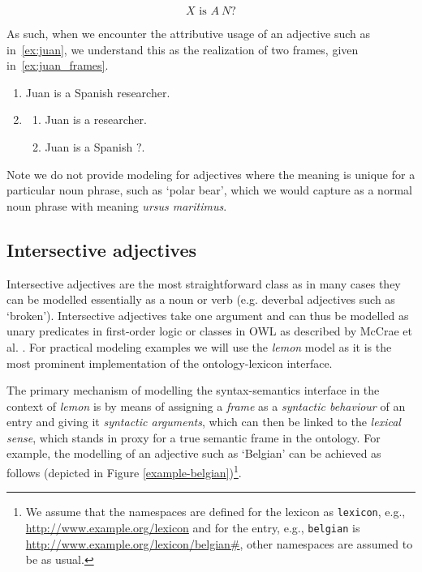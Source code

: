 \documentclass[11pt]{article}
\begin{document}
\vspace{-1.0em}
$$X\text{ is }A~N?$$
\vspace{-1.5em}

As such, when we encounter the attributive usage of an adjective such as in~\ref{ex:juan}, 
we understand this as the realization of two frames, given in~\ref{ex:juan_frames}.

\begin{enumerate}
\item Juan is a Spanish researcher. \label{ex:juan}
\item \begin{enumerate}
\item Juan is a researcher.
\item Juan is a Spanish $?$.
\end{enumerate}
\label{ex:juan_frames}
\end{enumerate}

Note we do not provide modeling for adjectives where the meaning is unique for a particular noun phrase,
such as `polar bear', which we would capture as a normal noun phrase with 
meaning \emph{ursus maritimus}.

\subsection{Intersective adjectives} \label{sec:intersectives}

Intersective adjectives are the most straightforward class as in many cases they 
can be modelled essentially as a noun or verb (e.g. deverbal adjectives such as `broken'). Intersective 
adjectives take one argument and can thus be modelled as unary predicates in first-order logic or classes in OWL as described by McCrae et al. \cite{mccrae2014design}. For practical modeling examples we will use the
\emph{lemon} model as it is the most prominent implementation of the 
ontology-lexicon interface.

The primary mechanism of modelling the syntax-semantics interface in the context 
of \emph{lemon} is by means of assigning a \emph{frame} as a \emph{syntactic 
behaviour} of an entry and giving it \emph{syntactic arguments}, which can then 
be linked to the \emph{lexical sense}, which stands in proxy for a true semantic 
frame in the ontology. For example, the modelling of an adjective such as 
`Belgian' can be achieved as follows (depicted in Figure 
\ref{example-belgian})\footnote{We assume that the namespaces are defined for 
the lexicon as {\tt lexicon}, e.g., \url{http://www.example.org/lexicon}
and for the entry, e.g., {\tt belgian} is \url{http://www.example.org/lexicon/belgian#},
other namespaces are assumed to be as usual.}.
\end{document}

